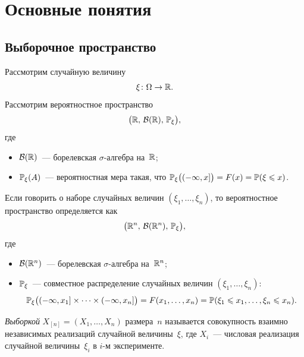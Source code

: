 \section{Основные понятия}
\label{lec:01}

\subsection{Выборочное пространство}

Рассмотрим случайную величину
\[
  \xi \colon \Omega \to \R.
\]
Рассмотрим вероятностное пространство
\[
  \bigl(\R,\, \mathcal{B}(\R),\, \P_{\xi}\bigr),
\]
где
\begin{itemize}
  \item $\mathcal{B}(\R)$~--- борелевская $\sigma$-алгебра на~$\R$;
  \item $\P_\xi(A)$~--- вероятностная мера такая, что
        $\P_\xi\bigl((-\infty, x]\bigr) = F(x) = \P(\xi \le x)$.
\end{itemize}

\medskip

Если говорить о наборе случайных величин $(\xi_1, \ldots, \xi_n)$, то вероятностное
пространство определяется как
\[
  \bigl(\R^n,\, \mathcal{B}(\R^n),\, \P_{\xi}\bigr),
\]
где
\begin{itemize}
  \item $\mathcal{B}(\R^n)$~--- борелевская $\sigma$-алгебра на~$\R^n$;
  \item $\P_\xi$~--- совместное распределение случайных величин $(\xi_1, \ldots, \xi_n)$:
        \[
          \P_\xi\bigl((-\infty, x_1] \times \cdots \times (-\infty, x_n]\bigr)
          = F(x_1, \ldots, x_n)
          = \P(\xi_1 \le x_1, \ldots, \xi_n \le x_n).
        \]
\end{itemize}


\begin{definition}
  \emph{Выборкой} $X_{[n]} = (X_1, \ldots, X_n)$ размера~$n$ называется совокупность
  взаимно независимых реализаций случайной величины~$\xi$, где $X_i$~--- числовая
  реализация случайной величины~$\xi_i$ в $i$-м эксперименте.
\end{definition}

